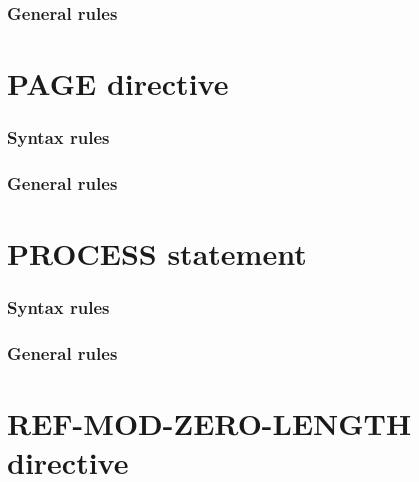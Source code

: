 \subsubsection{General rules}

\section{PAGE directive}

\begin{syntax}
  \directiveindicator{}
  \begin{0-1}
  \end{0-1}
\end{syntax}

\subsubsection{Syntax rules}

\subsubsection{General rules}

\section{PROCESS statement}

\begin{syntax}[\miscextcolour]
\end{syntax}

\subsubsection{Syntax rules}

\subsubsection{General rules}

\section{REF-MOD-ZERO-LENGTH directive}

\begin{syntax}
  \directiveindicator{}
  \begin{0-1}
     \\
  \end{0-1}
\end{syntax}

